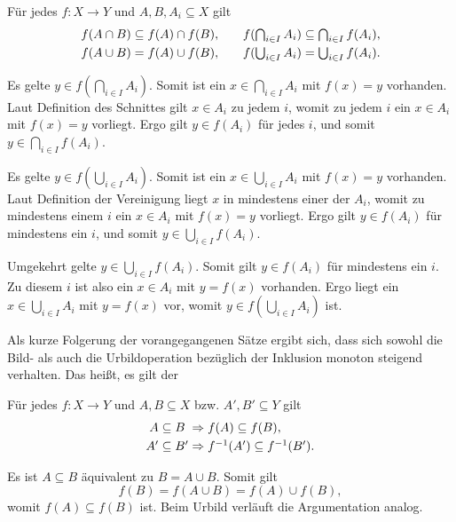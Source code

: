 \begin{Satz}
Für jedes $f\colon X\to Y$ und $A,B,A_i\subseteq X$ gilt
\[\begin{array}{@{}l@{\;}c@{\;}l@{\qquad}l@{\;}c@{\;}l@{}}
f(A\cap B) &\subseteq& f(A)\cap f(B), & f(\bigcap_{i\in I} A_i)&\subseteq&\bigcap_{i\in I} f(A_i),\\[3pt]
f(A\cup B) &=& f(A)\cup f(B), & f(\bigcup_{i\in I} A_i) &=& \bigcup_{i\in I} f(A_i).
\end{array}\]
\end{Satz}
\begin{Beweis}
Es gelte $y\in f(\bigcap_{i\in I} A_i)$. Somit ist ein
$x\in\bigcap_{i\in I}A_i$ mit $f(x)=y$ vorhanden. Laut Definition
des Schnittes gilt $x\in A_i$ zu jedem $i$, womit zu jedem $i$ ein
$x\in A_i$ mit $f(x)=y$ vorliegt. Ergo gilt $y\in f(A_i)$ für jedes $i$,
und somit $y\in\bigcap_{i\in I} f(A_i)$.

Es gelte $y\in f(\bigcup_{i\in I} A_i)$. Somit ist ein $x\in\bigcup_{i\in I}A_i$
mit $f(x)=y$ vorhanden. Laut Definition der Vereinigung liegt $x$ in
mindestens einer der $A_i$, womit zu mindestens einem $i$ ein $x\in A_i$
mit $f(x)=y$ vorliegt. Ergo gilt $y\in f(A_i)$ für mindestens ein
$i$, und somit $y\in\bigcup_{i\in I} f(A_i)$.

Umgekehrt gelte $y\in\bigcup_{i\in I} f(A_i)$. Somit gilt $y\in f(A_i)$
für mindestens ein $i$. Zu diesem $i$ ist also ein $x\in A_i$ mit
$y=f(x)$ vorhanden. Ergo liegt ein $x\in\bigcup_{i\in I} A_i$ mit
$y=f(x)$ vor, womit $y\in f(\bigcup_{i\in I} A_i)$ ist.\,\qedsymbol
\end{Beweis}

\noindent
Als kurze Folgerung der vorangegangenen Sätze ergibt sich, dass sich
sowohl die Bild- als auch die Urbildoperation bezüglich der Inklusion
monoton steigend verhalten. Das heißt, es gilt der
\begin{Satz}\label{Monotonie-Bild-Urbild}
Für jedes $f\colon X\to Y$ und $A,B\subseteq X$ bzw. $A',B'\subseteq Y$ gilt
\[\begin{array}{@{}r@{\;}c@{\;}l@{\;}l@{}}
A &\subseteq& B &\cond f(A)\subseteq f(B),\\[3pt]
A' &\subseteq& B' &\cond f^{-1}(A')\subseteq f^{-1}(B').
\end{array}\]
\end{Satz}
\begin{Beweis}
Es ist $A\subseteq B$ äquivalent zu $B = A\cup B$. Somit gilt
\[f(B) = f(A\cup B) = f(A)\cup f(B),\]
womit $f(A)\subseteq f(B)$ ist. Beim Urbild verläuft
die Argumentation analog.\,\qedsymbol
\end{Beweis}

